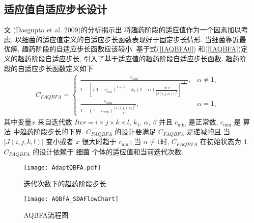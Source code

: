 \subsection{适应值自适应步长设计}
文 (Dasgupta et al. 2009)的分析揭示出 将趣药阶段的适应值作为一个因素加以考虑, 以细菌的适应值定义的自适应步长函数表现好于固定步长情形. 当细菌靠近最优解, 趣药阶段的自适应步长函数应该较小. 基于式(\ref{IAQBFA0}) 和(\ref{IAQBFA})定义的趣药阶段自适应步长, 引入了基于适应值的趣药阶段自适应步长函数. 趣药阶段的自适应步长函数定义如下
\begin{align}\label{FAQBFA}
C_{FAQBFA}
 =
\left\{
  \begin{array}{ll}
  \frac{c_{\min}}{1-\left[(1-c_{\min})^{1-\alpha}-k_1(1-\alpha)\frac{\ln x}{|J(i,j,k,l)|^{\beta}}\right]^{\frac{1}{1-\alpha}}},&  \alpha\neq 1,\\
  \frac{c_{\min}}{1-(1-c_{\min})\frac{|J(i,j,k,l)|^{\beta}}{x^{k_1}}},&  \alpha= 1,
  \end{array}
  \right.
\end{align}
其中变量$x$ 来自迭代数 $Iter=i\times j\times k \times l$, $k_1$, $\alpha$, $\beta$ 并且 $c_{\min}$ 是正常数, $c_{\min}$ 是 算法 中趋药阶段步长的下界. $C_{FAQBFA}$ 的设计要满足 $C_{FAQBFA}$ 是递减的且 当 $|J(i,j,k,l)|$ 变小或者 $x$ 很大时趋于 $c_{\min}$; 当 $\alpha\neq 1$时, $C_{FAQBFA}$ 在初始状态为 1. $C_{FAQBFA}$ 的设计依赖于 细菌 个体的适应值和当前迭代次数.
\begin{figure}[!tbp]
\begin{center}
    \texttt{[image: AdaptQBFA.pdf]}
    \caption{迭代次数下的趋药阶段步长}
    \label{AdaptQBFA:fig1}
    \vspace{0.5em}\centering
\end{center}
\end{figure}
\begin{figure*}[tb]
    \begin{center}
     \texttt{[image: AQBFA\_SDAFlowChart]}
      \caption{AQBFA流程图}
      \label{fig:FlowchartAQBFA}
    \end{center}
\end{figure*}
